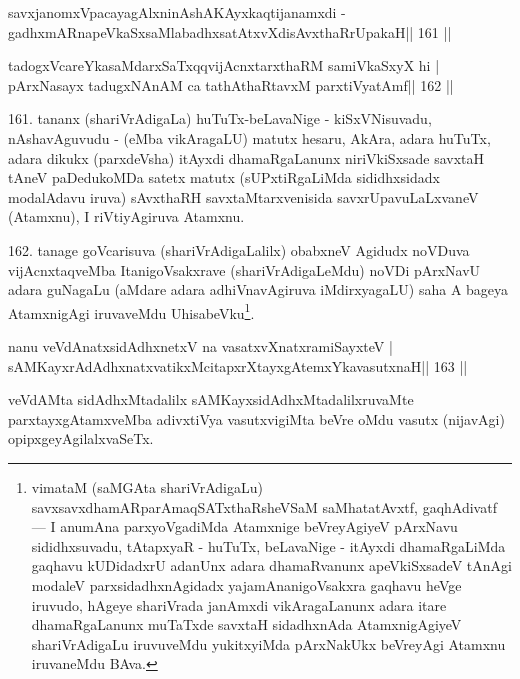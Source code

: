 
\begin{shl}
savxjanomxVpacayagAlxninAshAKAyxkaqtijanamxdi -
gadhxmARnapeVkaSxsaMlabadhxsatAtxvXdisAvxthaRrUpakaH\hfill || 161 ||
\end{shl}

\begin{shl}
tadogxVcareYkasaMdarxSaTxqqvijAcnxtarxthaRM samiVkaSxyX hi |
pArxNasayx tadugxNAnAM ca tathAthaRtavxM parxtiVyatAmf\hfill || 162 ||
\end{shl}

\begin{artha}
161. tananx (shariVrAdigaLa) huTuTx-beLavaNige - kiSxVNisuvadu,  nAshavAgu\-vudu - (eMba vikAragaLU) matutx hesaru, AkAra, adara huTuTx, adara dikukx (parxdeVsha) itAyxdi dhamaRgaLanunx niriVkiSxsade savxtaH tAneV paDedukoMDa satetx  matutx (sUPxtiRgaLiMda sididhxsidadx modalAdavu iruva) sAvxthaRH savxtaMtarxvenisida savxrUpavuLaLxvaneV (Atamxnu), I riVtiyAgiruva Atamxnu.
\end{artha}

\begin{artha}
162. tanage goVcarisuva (shariVrAdigaLalilx) obabxneV Agidudx noVDuva  vijAcnxtaqveMba ItanigoVsakxrave (shariVrAdigaLeMdu) noVDi pArxNavU adara guNagaLu (aMdare adara adhiVnavAgiruva iMdirxyagaLU) saha A bageya AtamxnigAgi iruvaveMdu UhisabeVku\footnote[9]{vimataM (saMGAta shariVrAdigaLu) savxsavxdhamARparAmaqSATxthaRsheVSaM saMhatatAvxtf, \-gaqhAdivatf  {\rm ---}  I anumAna parxyoVgadiMda Atamxnige beVreyAgiyeV pArxNavu sididhxsuvadu, tAtapxyaR - huTuTx, beLavaNige - itAyxdi dhamaRgaLiMda gaqhavu kUDidadxrU adanUnx adara dhamaRvanunx apeVkiSxsadeV tAnAgi modaleV parxsidadhxnAgidadx yajamAnanigoVsakxra gaqhavu heVge iruvudo, hAgeye shariVrada janAmxdi vikAragaLanunx adara itare dhamaRgaLanunx muTaTxde savxtaH sidadhxnAda AtamxnigAgiyeV shariVrAdigaLu iruvuveMdu yukitxyiMda pArxNakUkx beVreyAgi Atamxnu iruvaneMdu BAva.}.
\end{artha}


\begin{shl}
nanu veVdAnatxsidAdhxnetxV na vasatxvXnatxramiSayxteV |
sAMKayxrAdAdhxnatxvatikxMcitapxrXtayxgAtemxYkavasutxnaH\hfill || 163 ||
\end{shl}

\begin{artha}
veVdAMta sidAdhxMtadalilx sAMKayxsidAdhxMtadalilxruvaMte  parxtayxgAtamxveMba adivxtiVya vasutxvigiMta beVre oMdu vasutx (nijavAgi) opipxgeyAgilalxvaSeTx.
\end{artha}

